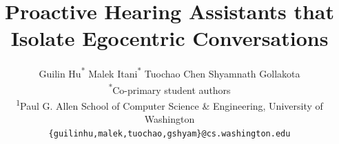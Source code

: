 \documentclass[11pt]{article}
\begin{document}
\author{
  Guilin Hu\textsuperscript{*} \quad
  Malek Itani\textsuperscript{*} \quad
  Tuochao Chen \quad
  Shyamnath Gollakota \\
  \textsuperscript{*}Co-primary student authors\\
  \textsuperscript{1}Paul G. Allen School of Computer Science \& Engineering, University of Washington \\
  \texttt{\{guilinhu,malek,tuochao,gshyam\}@cs.washington.edu}
}



\title{Proactive Hearing Assistants that Isolate Egocentric Conversations}












\newcommand{\squishlist}{%
  \begin{itemize}[itemsep=1pt,parsep=2pt,topsep=3pt,partopsep=0pt,
                  leftmargin=0em,itemindent=1em,labelwidth=1em,labelsep=0.5em]%
}
\newcommand{\squishend}{%
  \end{itemize}%
}





\makeatletter
\renewcommand{\sectionautorefname}{\S\@gobble}
\renewcommand{\subsectionautorefname}{\S\@gobble}
\renewcommand{\subsubsectionautorefname}{\S\@gobble}
\renewcommand{\appendixautorefname}{Appendix \@gobble}
\makeatother




\newcommand{\xref}[1]{\S\ref{#1}}
\end{document}
